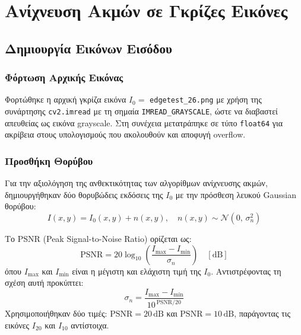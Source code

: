 \documentclass[12pt, a4paper]{article}
\begin{document}
\tableofcontents
\clearpage

\section{Ανίχνευση Ακμών σε Γκρίζες Εικόνες}

\subsection{Δημιουργία Εικόνων Εισόδου}

\subsubsection{Φόρτωση Αρχικής Εικόνας}

Φορτώθηκε η αρχική γκρίζα εικόνα $I_0 = $ \texttt{edgetest\_26.png} με χρήση της συνάρτησης
\texttt{cv2.imread} με τη σημαία \texttt{IMREAD\_GRAYSCALE}, ώστε να διαβαστεί απευθείας
ως εικόνα grayscale. Στη συνέχεια μετατράπηκε σε τύπο \texttt{float64} για ακρίβεια
στους υπολογισμούς που ακολουθούν και αποφυγή overflow.

\subsubsection{Προσθήκη Θορύβου}

Για την αξιολόγηση της ανθεκτικότητας των αλγορίθμων ανίχνευσης ακμών, δημιουργήθηκαν
δύο θορυβώδεις εκδόσεις της $I_0$ με την πρόσθεση λευκού Gaussian θορύβου:
\begin{equation}
    I(x, y) = I_0(x, y) + n(x, y), \quad n(x,y) \sim \mathcal{N}(0,\, \sigma_n^2)
\end{equation}


Το PSNR (Peak Signal-to-Noise Ratio) ορίζεται ως:
\begin{equation}
    \text{PSNR} = 20\log_{10}\!\left(\frac{I_{\max} - I_{\min}}{\sigma_n}\right) \quad [\text{dB}]
\end{equation}
όπου $I_{\max}$ και $I_{\min}$ είναι η μέγιστη και ελάχιστη τιμή της $I_0$.
Αντιστρέφοντας τη σχέση αυτή προκύπτει:
\begin{equation}
    \sigma_n = \frac{I_{\max} - I_{\min}}{10^{\,\text{PSNR}/20}}
\end{equation}
Χρησιμοποιήθηκαν δύο τιμές: $\text{PSNR} = 20\,\text{dB}$ και $\text{PSNR} = 10\,\text{dB}$,
παράγοντας τις εικόνες $I_{20}$ και $I_{10}$ αντίστοιχα.
\end{document}
